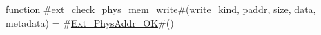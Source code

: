 function #\hyperref[sailRISCVzextzycheckzyphyszymemzywrite]{ext\_check\_phys\_mem\_write}#(write_kind, paddr, size, data, metadata) =
  #\hyperref[sailRISCVzExtzyPhysAddrzyOK]{Ext\_PhysAddr\_OK}#()
